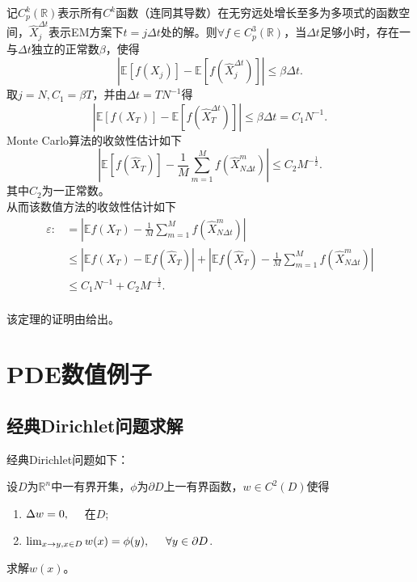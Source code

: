 \documentclass[oneside]{sysuthesis}
\begin{document}
\begin{theorem}\label{theo:convergence}
	记$C_p^k(\mathbb{R})$表示所有$C^k$函数（连同其导数）在无穷远处增长至多为多项式的函数空间，$\widehat{X}_j^{\Delta t}$表示EM方案下$t=j\Delta t$处的解。则$\forall f\in C_p^3(\mathbb{R})$，当$\Delta t$足够小时，存在一与$\Delta t$独立的正常数$\beta$，使得
	\[
	\left|\mathbb{E}[f(X_j)]-\mathbb{E}[f(\widehat{X}_j^{\Delta t})]\right|\le \beta\Delta t.
	\]
	\hspace*{2em}取$j=N,C_1=\beta T$，并由$\Delta t=TN^{-1}$得
	\[
	\left|\mathbb{E}[f(X_T)]-\mathbb{E}[f(\widehat{X}_T^{\Delta t})]\right|\le \beta\Delta t=C_1N^{-1}.
	\]
	Monte Carlo算法的收敛性估计如下
	\[
	\left|\mathbb{E}[f(\widehat{X}_T)]-\frac{1}{M}\sum_{m=1}^{M}f(\widehat{X}_{N\Delta t}^m)\right|\le C_2M^{-\frac{1}{2}}.
	\]
	其中$C_2$为一正常数。\\
	\hspace*{2em}从而该数值方法的收敛性估计如下
	\begin{equation*}
		\begin{split}
			\varepsilon :&= \left|\mathbb{E}f(X_T)-\frac{1}{M}\sum_{m=1}^{M}f(\widehat{X}_{N\Delta t}^m)\right| \\
			&\le \left|\mathbb{E}f(X_T)-\mathbb{E}f(\widehat{X}_T)\right|+\left|\mathbb{E}f(\widehat{X}_T)-\frac{1}{M}\sum_{m=1}^{M}f(\widehat{X}_{N\Delta t}^m)\right| \\
			&\le C_1N^{-1}+C_2M^{-\frac{1}{2}}.\\
		\end{split}
	\end{equation*}
\end{theorem}
该定理的证明由\cite{SDE_Numerical_method}给出。

\section{PDE数值例子}

\subsection{经典Dirichlet问题求解}

经典Dirichlet问题如下：

设$D$为$\mathbb{R}^n$中一有界开集，$\phi$为$\partial D$上一有界函数，$w\in C^2(D)$使得

\begin{enumerate}[label=(\arabic*)]
	\item $\Delta w=0,\hspace{0.5cm}$在$D$;
	\item $\lim_{x\to y,x\in D}w(x)=\phi(y),\hspace{0.5cm}\forall y\in\partial D$.
\end{enumerate}
求解$w(x)$。
\end{document}

